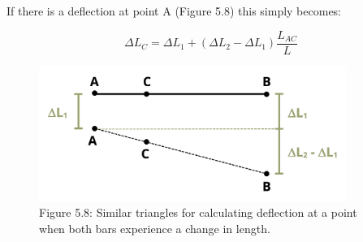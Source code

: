 \documentclass[
  letterpaper,
  DIV=11,
  numbers=noendperiod]{scrreprt}
\begin{document}
If there is a deflection at point A (Figure 5.8) this simply becomes:

\[
\Delta L_C=\Delta L_1+\left(\Delta L_2-\Delta L_1\right) \frac{L_{A C}}{L}\]

\begin{figure}[H]

{\centering \includegraphics[width=3.94792in,height=\textheight]{images/PNGs/Figure 5.9.png}

}

\caption{Figure 5.8: Similar triangles for calculating deflection at a
point when both bars experience a change in length.}

\end{figure}%
\end{document}
